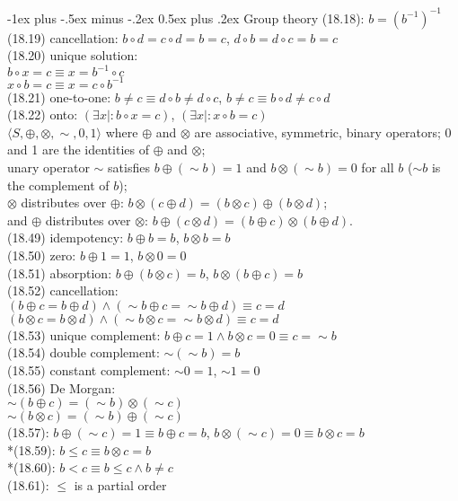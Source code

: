 \documentclass[10pt,landscape]{article}
\makeatletter
\renewcommand{\section}{\@startsection{section}{1}{0mm}%
                                {-1ex plus -.5ex minus -.2ex}%
                                {0.5ex plus .2ex}%
                                {\normalfont\small\bfseries}}
\makeatother
\begin{document}
\begin{multicols}{3}
{\section{Group theory}
(18.18): $b=(b^{-1})^{-1}$\\
(18.19) cancellation: $b\circ d=c\circ d=b=c$, $d\circ b=d\circ c=b=c$\\
(18.20) unique solution:\\
\qquad $b\circ x=c\equiv x=b^{-1}\circ c$\\
\qquad $x\circ b=c\equiv x=c\circ b^{-1}$\\
(18.21) one-to-one: $b\neq c\equiv d\circ b\neq d\circ c$, $b\neq c\equiv b\circ d\neq c\circ d$\\
(18.22) onto: $(\exists x\mid: b\circ x=c)$, $(\exists x\mid: x\circ b=c)$\\
$\langle S,\oplus, \otimes, \sim, 0, 1\rangle$ where $\oplus$ and $\otimes$ are associative, symmetric, binary operators; 0 and 1 are the identities of $\oplus$ and $\otimes$; \\
    unary operator $\sim$ satisfies $b\oplus (\sim b)=1$ and $b\otimes (\sim b)=0$ for all $b$ ($\sim b$ is the complement of $b$); \\
$\otimes$ distributes over $\oplus$: $b\otimes (c\oplus d)=(b\otimes c)\oplus (b\otimes d)$;\\
and $\oplus$ distributes over $\otimes$: $b\oplus (c\otimes d)=(b\oplus c)\otimes (b\oplus d)$.\\
(18.49) idempotency: $b\oplus b= b$, $b\otimes b=b$\\
(18.50) zero: $b\oplus 1=1$, $b\otimes 0 = 0$\\
(18.51) absorption: $b\oplus(b\otimes c)=b$, $b\otimes (b\oplus c)=b$\\
(18.52) cancellation:\\
\qquad $(b\oplus c=b\oplus d)\land (\sim b\oplus c=\sim b\oplus d)\equiv c=d$\\
\qquad $(b\otimes c=b\otimes d)\land (\sim b\otimes c=\sim b\otimes d)\equiv c=d$\\
(18.53) unique complement: $b\oplus c=1\land b\otimes c=0 \equiv c=\sim b$\\
(18.54) double complement: $\sim(\sim b)=b$\\
(18.55) constant complement: $\sim 0 = 1$, $\sim 1= 0$\\ 
(18.56) De Morgan:\\
\qquad $\sim(b\oplus c)=(\sim b)\otimes (\sim c)$\\
\qquad $\sim(b\otimes c)=(\sim b)\oplus (\sim c)$\\
(18.57): $b\oplus (\sim c)=1\equiv b\oplus c=b$, $b\otimes (\sim c)=0\equiv b\otimes c = b$\\
*(18.59): $b\leq c\equiv b\otimes c = b$\\
*(18.60): $b<c\equiv b\leq c\land b\neq c$\\
(18.61): $\leq$ is a partial order
}
\end{multicols}
\end{document}
